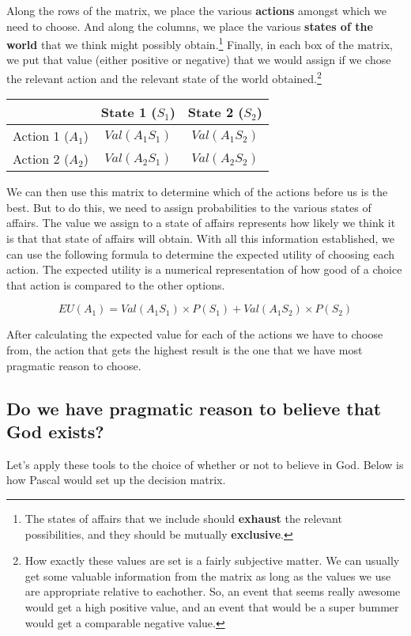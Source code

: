 Along the rows of the matrix, we place the various \textbf{actions} amongst which we need to choose.  And along the columns, we place the various \textbf{states of the world} that we think might possibly obtain.\footnote{The states of affairs that we include should \textbf{exhaust} the relevant possibilities, and they should be mutually \textbf{exclusive}.}  Finally, in each box of the matrix, we put that value (either positive or negative) that we would assign if we chose the relevant action and the relevant state of the world obtained.\footnote{How exactly these values are set is a fairly subjective matter.  We can usually get some valuable information from the matrix as long as the values we use are appropriate relative to eachother.  So, an event that seems really awesome would get a high positive value, and an event that would be a super bummer would get a comparable negative value.}

\begin{center}
 \begin{tabular}{c|c|c|}
 & State 1 ($S_1$) & State 2 ($S_2$) \\ \hline
Action 1 ($A_1$) & $Val(A_1S_1)$ & $Val(A_1S_2)$ \\ \hline
Action 2 ($A_2$) & $Val(A_2S_1)$ & $Val(A_2S_2)$ \\ \hline
\end{tabular}
\end{center}

We can then use this matrix to determine which of the actions before us is the best.  But to do this, we need to assign probabilities to the various states of affairs.  The value we assign to a state of affairs represents how likely we think it is that that state of affairs will obtain.  With all this information established, we can use the following formula to determine the expected utility of choosing each action.  The expected utility is a numerical representation of how good of a choice that action is compared to the other options.

\[EU(A_1)=Val(A_1S_1)\times P(S_1) + Val(A_1S_2)\times P(S_2)\]

After calculating the expected value for each of the actions we have to choose from, the action that gets the highest result is the one that we have most pragmatic reason to choose.

\subsection{Do we have pragmatic reason to believe that God exists?}
Let's apply these tools to the choice of whether or not to believe in God.  Below is how Pascal would set up the decision matrix.

